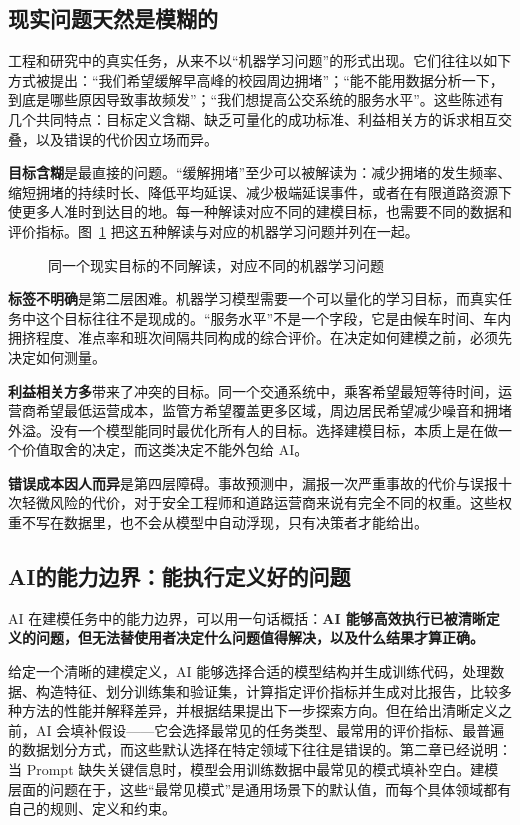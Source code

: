 \subsection{现实问题天然是模糊的}

工程和研究中的真实任务，从来不以“机器学习问题”的形式出现。它们往往以如下方式被提出：“我们希望缓解早高峰的校园周边拥堵”；“能不能用数据分析一下，到底是哪些原因导致事故频发”；“我们想提高公交系统的服务水平”。这些陈述有几个共同特点：目标定义含糊、缺乏可量化的成功标准、利益相关方的诉求相互交叠，以及错误的代价因立场而异。

\textbf{目标含糊}是最直接的问题。“缓解拥堵”至少可以被解读为：减少拥堵的发生频率、缩短拥堵的持续时长、降低平均延误、减少极端延误事件，或者在有限道路资源下使更多人准时到达目的地。每一种解读对应不同的建模目标，也需要不同的数据和评价指标。图~\ref{fig:ch03_ambiguity} 把这五种解读与对应的机器学习问题并列在一起。

\begin{figure}[H]
  \centering
  \caption{同一个现实目标的不同解读，对应不同的机器学习问题}
  \label{fig:ch03_ambiguity}
\end{figure}


\textbf{标签不明确}是第二层困难。机器学习模型需要一个可以量化的学习目标，而真实任务中这个目标往往不是现成的。“服务水平”不是一个字段，它是由候车时间、车内拥挤程度、准点率和班次间隔共同构成的综合评价。在决定如何建模之前，必须先决定如何测量。

\textbf{利益相关方多}带来了冲突的目标。同一个交通系统中，乘客希望最短等待时间，运营商希望最低运营成本，监管方希望覆盖更多区域，周边居民希望减少噪音和拥堵外溢。没有一个模型能同时最优化所有人的目标。选择建模目标，本质上是在做一个价值取舍的决定，而这类决定不能外包给 AI。

\textbf{错误成本因人而异}是第四层障碍。事故预测中，漏报一次严重事故的代价与误报十次轻微风险的代价，对于安全工程师和道路运营商来说有完全不同的权重。这些权重不写在数据里，也不会从模型中自动浮现，只有决策者才能给出。

\subsection{AI的能力边界：能执行定义好的问题}

AI 在建模任务中的能力边界，可以用一句话概括：\textbf{AI 能够高效执行已被清晰定义的问题，但无法替使用者决定什么问题值得解决，以及什么结果才算正确。}

给定一个清晰的建模定义，AI 能够选择合适的模型结构并生成训练代码，处理数据、构造特征、划分训练集和验证集，计算指定评价指标并生成对比报告，比较多种方法的性能并解释差异，并根据结果提出下一步探索方向。但在给出清晰定义之前，AI 会填补假设——它会选择最常见的任务类型、最常用的评价指标、最普遍的数据划分方式，而这些默认选择在特定领域下往往是错误的。第二章已经说明：当 Prompt 缺失关键信息时，模型会用训练数据中最常见的模式填补空白。建模层面的问题在于，这些“最常见模式”是通用场景下的默认值，而每个具体领域都有自己的规则、定义和约束。


